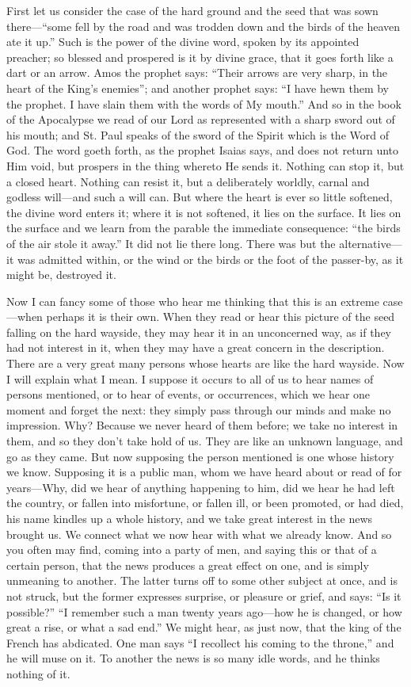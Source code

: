 First let us consider the case of the hard ground
and the seed that was sown there—``some fell by the road and was
trodden down and the birds of the heaven ate it up.'' Such is the power
of the divine word, spoken by its appointed preacher; so blessed and
prospered is it by divine grace, that it goes forth like a dart
or an arrow. Amos the prophet says: ``Their arrows are very sharp, in
the heart of the King's enemies''; and another prophet says: ``I have
hewn them by the prophet. I have slain them with the words of My
mouth.'' And so in the book of the Apocalypse we read of our Lord as
represented with a sharp sword out of his mouth; and St. Paul speaks
of the sword of the Spirit which is the Word of God. The word goeth
forth, as the prophet Isaias says, and does not return unto Him void,
but prospers in the thing whereto He sends it. Nothing can stop it,
but a closed heart. Nothing can resist it, but a deliberately worldly,
carnal and godless will—and such a will can. But where the heart is
ever so little softened, the divine word enters it; where it is not
softened, it lies on the surface. It lies on the surface and we learn
from the parable the immediate consequence: ``the birds of the air
stole it away.'' It did not lie there long. There was but the
alternative—it was admitted within, or the wind or the birds or the
foot of the passer-by, as it might be, destroyed it.

Now I can fancy some of those who hear me
thinking that this is an extreme case—when perhaps it is their own.
When they read or hear this picture of the seed falling on the hard
wayside, they may hear it in an unconcerned way, as if they had not
interest in it, when they may have a great concern in the description.
There are a very great many persons whose hearts are like the hard wayside. Now I will explain what I mean. I suppose it occurs to
all of us to hear names of persons mentioned, or to hear of events, or
occurrences, which we hear one moment and forget the next: they simply
pass through our minds and make no impression. Why? Because we never
heard of them before; we take no interest in them, and so they don't
take hold of us. They are like an unknown language, and go as they
came. But now supposing the person mentioned is one whose history we
know. Supposing it is a public man, whom we have heard about or read
of for years—Why, did we hear of anything happening to him, did we
hear he had left the country, or fallen into misfortune, or fallen
ill, or been promoted, or had died, his name kindles up a whole
history, and we take great interest in the news brought us. We connect
what we now hear with what we already know. And so you often may find,
coming into a party of men, and saying this or that of a certain
person, that the news produces a great effect on one, and is simply
unmeaning to another. The latter turns off to some other subject at
once, and is not struck, but the former expresses surprise, or
pleasure or grief, and says: ``Is it possible?'' ``I remember such a
man twenty years ago—how he is changed, or how great a rise, or what
a sad end.'' We might hear, as just now, that the king of the French
has abdicated. One man says ``I recollect his coming to the throne,''
and he will muse on it. To another the news is so many idle
words, and he thinks nothing of it.

